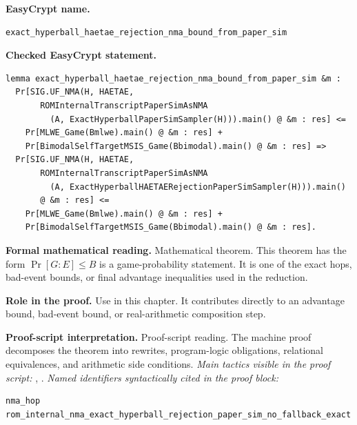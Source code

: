 \begin{formaltheorem}
\noindent\textbf{EasyCrypt name.}
\begin{lstlisting}[language=EasyCrypt,basicstyle=\ttfamily\scriptsize]
exact_hyperball_haetae_rejection_nma_bound_from_paper_sim
\end{lstlisting}
\noindent\textbf{Checked EasyCrypt statement.}
\begin{lstlisting}[language=EasyCrypt,basicstyle=\ttfamily\scriptsize]
lemma exact_hyperball_haetae_rejection_nma_bound_from_paper_sim &m :
  Pr[SIG.UF_NMA(H, HAETAE,
       ROMInternalTranscriptPaperSimAsNMA
         (A, ExactHyperballPaperSimSampler(H))).main() @ &m : res] <=
    Pr[MLWE_Game(Bmlwe).main() @ &m : res] +
    Pr[BimodalSelfTargetMSIS_Game(Bbimodal).main() @ &m : res] =>
  Pr[SIG.UF_NMA(H, HAETAE,
       ROMInternalTranscriptPaperSimAsNMA
         (A, ExactHyperballHAETAERejectionPaperSimSampler(H))).main()
       @ &m : res] <=
    Pr[MLWE_Game(Bmlwe).main() @ &m : res] +
    Pr[BimodalSelfTargetMSIS_Game(Bbimodal).main() @ &m : res].
\end{lstlisting}
\noindent\textbf{Formal mathematical reading.}
Mathematical theorem. This theorem has the form \(\Pr[G:E] \le B\) is a game-probability statement.  It is one of the exact hops, bad-event bounds, or final advantage inequalities used in the reduction.

\noindent\textbf{Role in the proof.}
Use in this chapter. It contributes directly to an advantage bound, bad-event bound, or real-arithmetic composition step.

\noindent\textbf{Proof-script interpretation.}
Proof-script reading. The machine proof decomposes the theorem into rewrites, program-logic obligations, relational equivalences, and arithmetic side conditions.
\emph{Main tactics visible in the proof script:} , .
\emph{Named identifiers syntactically cited in the proof block:}
\begin{lstlisting}[language=EasyCrypt,basicstyle=\ttfamily\scriptsize]
nma_hop
rom_internal_nma_exact_hyperball_rejection_paper_sim_no_fallback_exact
\end{lstlisting}

\end{formaltheorem}

